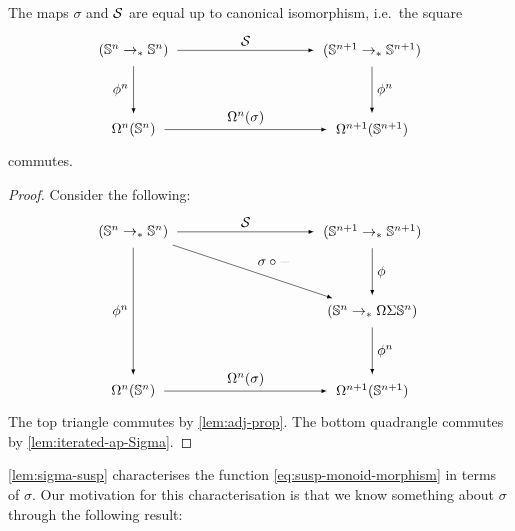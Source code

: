 \documentclass[english,a4]{article}
\renewcommand{\ap}[1]{\left[{#1}\right]}
\begin{document}
\begin{lemma} \label{lem:sigma-susp}
    The maps $\sigma$ and $\operatorname{\mathcal S}$ are equal up to canonical isomorphism, i.e.\ the square
    \begin{equation} \label{eq:needs-to-commute}
    \begin{tikzpicture}[x=6cm,y=-2cm,baseline=(current bounding box.center)]
    \tikzset{arrow/.style={shorten >=0.1cm,shorten <=.1cm,-latex}}
    \node (A) at (0,0) {$(\Sn n \to_* \Sn n)$}; 
    \node (B) at (0,1) {$\Omega^n(\Sn n)$}; 
    \node (C) at (1,1) {$\Omega^{n+1}(\Sn {n+1})$}; 
    \node (D) at (1,0) {$(\Sn {n+1} \to_* \Sn {n+1})$}; 
    
    \draw[arrow] (A) to node [left] {$\phi^n$} (B);
    \draw[arrow] (B) to node [above] {$\Omega^n(\sigma)$} (C);
    \draw[arrow] (D) to node [right] {$\phi^n$} (C);
    \draw[arrow] (A) to node [above] {$\susp$} (D);
    \end{tikzpicture}
    \end{equation}
    commutes.
\end{lemma}
\begin{proof}
 Consider the following:
\begin{equation}
\begin{tikzpicture}[x=6cm,y=-2cm,baseline=(current bounding box.center)]
\tikzset{arrow/.style={shorten >=0.1cm,shorten <=.1cm,-latex}}
\node (A) at (0,0) {$(\Sn n \to_* \Sn n)$}; 
\node (B) at (0,2) {$\Omega^n(\Sn n)$}; 
\node (C) at (1,2) {$\Omega^{n+1}(\Sn {n+1})$}; 
\node (D) at (1,0) {$(\Sn {n+1} \to_* \Sn {n+1})$}; 
\node (E) at (1,1) {$(\Sn n \to_* \Omega \Sigma \Sn n)$};

\draw[arrow] (A) to node [left] {$\phi^n$} (B);
\draw[arrow] (B) to node [above] {$\Omega^n(\sigma)$} (C);
\draw[arrow] (A) to node [above] {$\susp$} (D);
\draw[arrow] (D) to node [right] {$\phi$} (E);
\draw[arrow] (E) to node [right] {$\phi^n$} (C);
\draw[arrow] (A) to node [above right] {$\sigma \circ \blank$} (E);
\end{tikzpicture}
\end{equation}
The top triangle commutes by \cref{lem:adj-prop}.
The bottom quadrangle commutes by \cref{lem:iterated-ap-Sigma}.\todo{fix $\ap f$ vs $\Omega(f)$!!}
\end{proof}

\cref{lem:sigma-susp} characterises the function \eqref{eq:susp-monoid-morphism}
in terms of $\sigma$.
Our motivation for this characterisation is that we know something about $\sigma$ through the following result:
\end{document}
